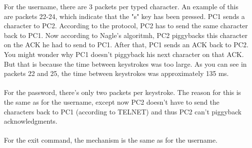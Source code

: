

For the username, there are 3 packets per typed character. An example of this are packets 22-24, which indicate that the "s" key has been pressed.
PC1 sends a character to PC2. According to the protocol, PC2 has to send the same character back to PC1. Now according to Nagle's algoritmh, PC2 piggybacks this character on the ACK he had to send to PC1.
After that, PC1 sends an ACK back to PC2.
You might wonder why PC1 doesn't piggyback his next character on that ACK. But that is because the time between keystrokes was too large. As you can see in packets 22 and 25, the time between keystrokes was approximately 135 ms. \\
\\
For the password, there's only two packets per keystroke. The reason for this is the same as for the username, except now PC2 doesn't have to send the characters back to PC1 (according to TELNET) and thus PC2 can't piggyback acknowledgments. \\
\\
For the exit command, the mechanism is the same as for the username.
